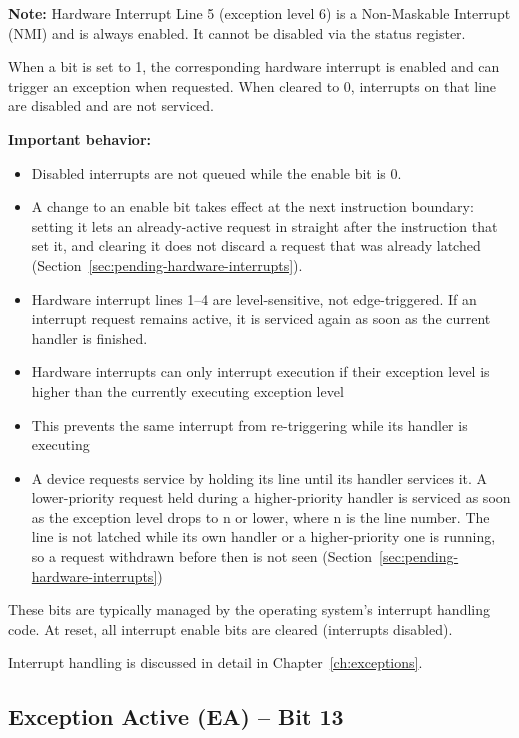 \textbf{Note:} Hardware Interrupt Line 5 (exception level 6) is a Non-Maskable Interrupt (NMI) and is always enabled. It cannot
be disabled via the status register.

When a bit is set to 1, the corresponding hardware interrupt is enabled and can trigger an exception when requested.
When cleared to 0, interrupts on that line are disabled and are not serviced.

\textbf{Important behavior:}
\begin{itemize}
	\item Disabled interrupts are not queued while the enable bit is 0.
	\item A change to an enable bit takes effect at the next instruction boundary: setting it lets an already-active request in
	      straight after the instruction that set it, and clearing it does not discard a request that was already latched
	      (Section~\ref{sec:pending-hardware-interrupts}).
	\item Hardware interrupt lines 1--4 are level-sensitive, not edge-triggered. If an interrupt request remains active, it is
	      serviced again as soon as the current handler is finished.
	\item Hardware interrupts can only interrupt execution if their exception level is higher than the currently executing
	      exception level
	\item This prevents the same interrupt from re-triggering while its handler is executing
	\item A device requests service by holding its line until its handler services it. A lower-priority request held during a
	      higher-priority handler is serviced as soon as the exception level drops to n or lower, where n is the line number. The
	      line is not latched while its own handler or a higher-priority one is running, so a request withdrawn before then is
	      not seen (Section~\ref{sec:pending-hardware-interrupts})
\end{itemize}

These bits are typically managed by the operating system's interrupt handling code. At reset, all interrupt enable bits
are cleared (interrupts disabled).

Interrupt handling is discussed in detail in Chapter~\ref{ch:exceptions}.

\subsection{Exception Active (EA) -- Bit 13}

